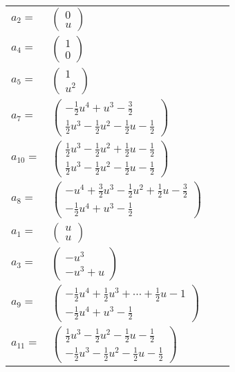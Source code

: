 \documentclass[1p]{elsarticle_modified}
\theoremstyle{definition}
\begin{document}
\begin{tabular}{m{7pt} m{180pt} m{7pt} m{180pt} }
\flushright $a_{2}=$&$\begin{pmatrix}0\\u\end{pmatrix}$ \\
\flushright $a_{4}=$&$\begin{pmatrix}1\\0\end{pmatrix}$ \\
\flushright $a_{5}=$&$\begin{pmatrix}1\\u^2\end{pmatrix}$ \\
\flushright $a_{7}=$&$\begin{pmatrix}-\frac{1}{2} u^4+u^3-\frac{3}{2}\\\frac{1}{2} u^3-\frac{1}{2} u^2-\frac{1}{2} u-\frac{1}{2}\end{pmatrix}$ \\
\flushright $a_{10}=$&$\begin{pmatrix}\frac{1}{2} u^3-\frac{1}{2} u^2+\frac{1}{2} u-\frac{1}{2}\\\frac{1}{2} u^3-\frac{1}{2} u^2-\frac{1}{2} u-\frac{1}{2}\end{pmatrix}$ \\
\flushright $a_{8}=$&$\begin{pmatrix}- u^4+\frac{3}{2} u^3-\frac{1}{2} u^2+\frac{1}{2} u-\frac{3}{2}\\-\frac{1}{2} u^4+u^3-\frac{1}{2}\end{pmatrix}$ \\
\flushright $a_{1}=$&$\begin{pmatrix}u\\u\end{pmatrix}$ \\
\flushright $a_{3}=$&$\begin{pmatrix}- u^3\\- u^3+u\end{pmatrix}$ \\
\flushright $a_{9}=$&$\begin{pmatrix}-\frac{1}{2} u^4+\frac{1}{2} u^3+\cdots+\frac{1}{2} u-1\\-\frac{1}{2} u^4+u^3-\frac{1}{2}\end{pmatrix}$ \\
\flushright $a_{11}=$&$\begin{pmatrix}\frac{1}{2} u^3-\frac{1}{2} u^2-\frac{1}{2} u-\frac{1}{2}\\-\frac{1}{2} u^3-\frac{1}{2} u^2-\frac{1}{2} u-\frac{1}{2}\end{pmatrix}$ \\

\end{tabular}
\end{document}
